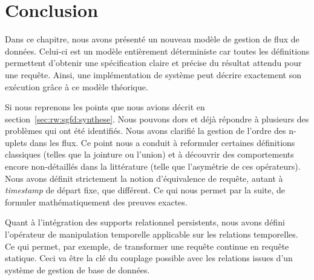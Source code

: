 \section{Conclusion}\label{sec:contrib:astral:conclusion}
Dans ce chapitre, nous avons présenté un nouveau modèle de gestion de flux de données. Celui-ci est un modèle entièrement déterministe car toutes les définitions permettent d'obtenir une spécification claire et précise du résultat attendu pour une requête. Ainsi, une implémentation de système peut décrire exactement son exécution grâce à ce modèle théorique.

Si nous reprenons les points que nous avions décrit en section~\ref{sec:rw:sgfd:synthese}. Nous pouvons dors et déjà répondre à plusieurs des problèmes qui ont été identifiés. Nous avons clarifié la gestion de l'ordre des n-uplets dans les flux. Ce point nous a conduit à reformuler certaines définitions classiques (telles que la jointure ou l'union) et à découvrir des comportements encore non-détaillés dans la littérature (telle que l'asymétrie de ces opérateurs). Nous avons définit strictement la notion d'équivalence de requête, autant à \textit{timestamp} de départ fixe, que différent. Ce qui nous permet par la suite, de formuler mathématiquement des preuves exactes.

Quant à l'intégration des supports relationnel persistents, nous avons défini l'opérateur de manipulation temporelle applicable sur les relations temporelles. Ce qui permet, par exemple, de transformer une requête continue en requête statique. Ceci va être la clé du couplage possible avec les relations issues d'un système de gestion de base de données. 
